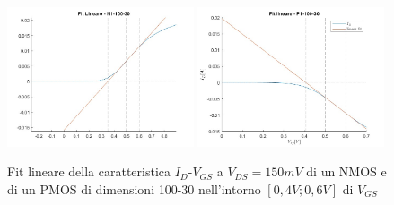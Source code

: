 \documentclass[12pt, letterpaper]{book}
\begin{document}
\begin{figure}[h!]
\centering
 \includegraphics[width=0.49\textwidth]{LinearFit-N1-100-30}
 \includegraphics[width=0.49\textwidth]{LinearFit-P1-100-30}
 \caption{Fit lineare della caratteristica  $I_D$-$V_{GS}$ a $V_{DS}=150mV$ di un NMOS e di un PMOS di dimensioni 100-30 nell'intorno $[0,4V ; 0,6V]$ di $V_{GS}$}
\end{figure}
\end{document}
